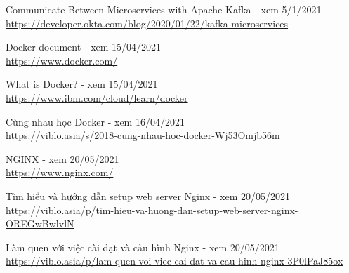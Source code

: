\documentclass[12pt,a4paper,oneside]{book}
\begin{document}
\begin{thebibliography}{80}
        \bibitem{} Communicate Between Microservices with Apache Kafka - xem 5/1/2021\\
        \url{https://developer.okta.com/blog/2020/01/22/kafka-microservices}
        
        \bibitem{} Docker document - xem 15/04/2021\\
        \url{https://www.docker.com/}
        
        \bibitem{} What is Docker? - xem 15/04/2021\\
        \url{https://www.ibm.com/cloud/learn/docker}
        
        \bibitem{} Cùng nhau học Docker - xem 16/04/2021\\
        \url{https://viblo.asia/s/2018-cung-nhau-hoc-docker-Wj53Omjb56m}
        
         NGINX - xem 20/05/2021\\
        \url{https://www.nginx.com/}
        
        \bibitem{} Tìm hiểu và hướng dẫn setup web server Nginx - xem 20/05/2021\\
        \url{https://viblo.asia/p/tim-hieu-va-huong-dan-setup-web-server-nginx-OREGwBwlvlN}
        
        \bibitem{} Làm quen với việc cài đặt và cấu hình Nginx - xem 20/05/2021\\
        \url{https://viblo.asia/p/lam-quen-voi-viec-cai-dat-va-cau-hinh-nginx-3P0lPaJ85ox}
        

    \end{thebibliography}
\end{document}
